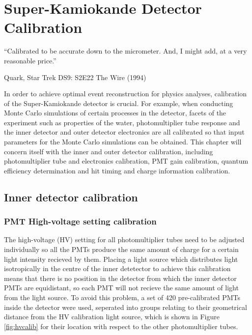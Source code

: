 \chapter{Super-Kamiokande Detector Calibration}
\epigraph{``Calibrated to be accurate down to the micrometer. And, I might add, at a very reasonable price.''}{Quark, Star Trek DS9: S2E22 The Wire (1994)}
\label{chp:superkcalib}

In order to achieve optimal event reconstruction for physics analyses, calibration of the Super-Kamiokande detector is crucial. For example, when conducting Monte Carlo simulations of certain processes in the detector, facets of the experiment such as properties of the water, photomultiplier tube response and the inner detector and outer detector electronics are all calibrated so that input parameters for the Monte Carlo simulations can be obtained. This chapter will concern itself with the inner and outer detector calibration, including photomultiplier tube and electronics calibration, PMT gain calibration, quantum efficiency determination and hit timing and charge information calibration. 

\section{Inner detector calibration}

\subsection{PMT High-voltage setting calibration}

The high-voltage (HV) setting for all photomultiplier tubes need to be adjusted individually so all the PMTs produce the same amount of charge for a certain light intensity recieved by them. Placing a light source which distributes light isotropically in the centre of the inner detetector to achieve this calibration means that there is no position in the detector from which the inner detector PMTs are equidistant, so each PMT will not recieve the same amount of light from the light source. To avoid this problem, a set of 420 pre-calibrated PMTs inside the detector were used, seperated into groups relating to their geometrical distance from the HV calibration light source, which is shown in Figure \ref{fig:hvcalib} for their location with respect to the other photomultiplier tubes.

